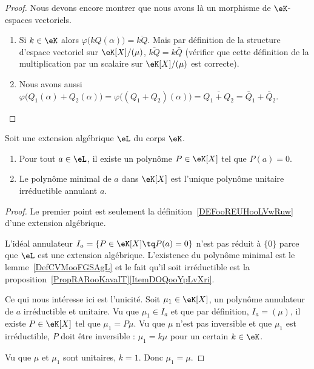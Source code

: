 \begin{proof}
    Nous devons encore montrer que nous avons là un morphisme de \( \eK\)-espaces vectoriels.
    \begin{enumerate}
        \item
            Si \( k\in \eK\) alors \( \varphi\big( kQ(\alpha) \big)=\overline{ kQ }\). Mais par définition de la structure d'espace vectoriel sur \( \eK[X]/(\mu)\), \( \overline{ kQ }=k\bar Q\) (vérifier que cette définition de la multiplication par un scalaire sur \( \eK[X]/(\mu)\) est correcte).
        \item
            Nous avons aussi \( \varphi\big( Q_1(\alpha)+Q_2(\alpha) \big)=\varphi\big( (Q_1+Q_2)(\alpha) \big)=\overline{ Q_1+Q_2 }=\bar Q_1+\bar Q_2\).
    \end{enumerate}
\end{proof}

\begin{proposition}      \label{PROPooALFJooDjmIcb}
    Soit une extension algébrique \( \eL\) du corps $\eK$.
    \begin{enumerate}
        \item
            Pour tout \( a\in \eL\), il existe un polynôme \( P\in \eK[X]\) tel que \( P(a)=0\).
        \item       \label{ITEMooEFNFooKYqXDk}
            Le polynôme minimal de \( a\) dans \( \eK[X]\) est l'unique polynôme unitaire irréductible annulant \( a\).
    \end{enumerate}
\end{proposition}

\begin{proof}
    Le premier point est seulement la définition~\ref{DEFooREUHooLVwRuw} d'une extension algébrique.

    L'idéal annulateur \( I_a=\{ P\in \eK[X]\tq P(a)=0 \}\) n'est pas réduit à \( \{ 0 \}\) parce que \( \eL\) est une extension algébrique. L'existence du polynôme minimal est le lemme~\ref{DefCVMooFGSAgL} et le fait qu'il soit irréductible est la proposition~\ref{PropRARooKavaIT}\ref{ItemDOQooYpLvXri}.

    Ce qui nous intéresse ici est l'unicité. Soit \( \mu_1\in \eK[X]\), un polynôme annulateur de \( a\) irréductible et unitaire. Vu que \( \mu_1\in I_a\) et que par définition, \( I_a=(\mu)\), il existe \( P\in \eK[X]\) tel que \( \mu_1=P\mu\). Vu que \( \mu\) n'est pas inversible et que \( \mu_1\) est irréductible, \( P\) doit être inversible : \( \mu_1=k\mu\) pour un certain \( k\in \eK\).

    Vu que \( \mu\) et \( \mu_1\) sont unitaires, \( k=1\). Donc \( \mu_1=\mu\).
\end{proof}

